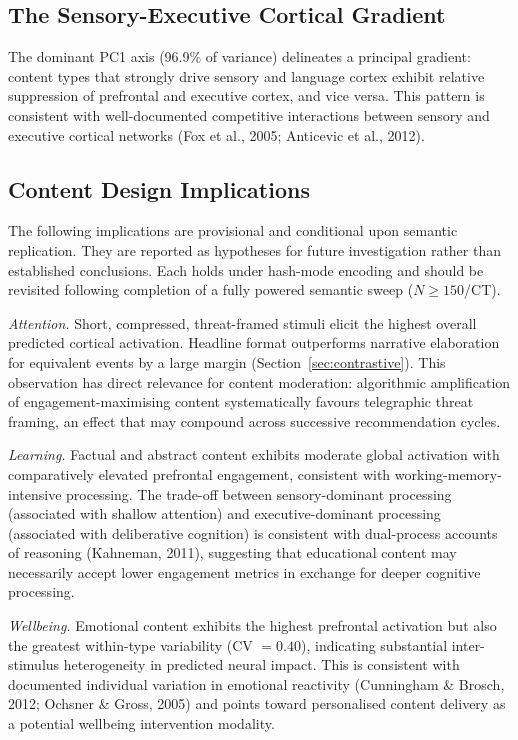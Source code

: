 \documentclass[11pt,letterpaper]{article}
\numberwithin{equation}{section}
\begin{document}
\subsection{The Sensory-Executive Cortical Gradient}

The dominant PC1 axis (96.9\% of variance) delineates a principal gradient: content types that strongly drive sensory and language cortex exhibit relative suppression of prefrontal and executive cortex, and vice versa. This pattern is consistent with well-documented competitive interactions between sensory and executive cortical networks (Fox et al., 2005; Anticevic et al., 2012).

\subsection{Content Design Implications}

The following implications are provisional and conditional upon semantic replication. They are reported as hypotheses for future investigation rather than established conclusions. Each holds under hash-mode encoding and should be revisited following completion of a fully powered semantic sweep ($N \geq 150$/CT).

\textit{Attention.} Short, compressed, threat-framed stimuli elicit the highest overall predicted cortical activation. Headline format outperforms narrative elaboration for equivalent events by a large margin (Section~\ref{sec:contrastive}). This observation has direct relevance for content moderation: algorithmic amplification of engagement-maximising content systematically favours telegraphic threat framing, an effect that may compound across successive recommendation cycles.

\textit{Learning.} Factual and abstract content exhibits moderate global activation with comparatively elevated prefrontal engagement, consistent with working-memory-intensive processing. The trade-off between sensory-dominant processing (associated with shallow attention) and executive-dominant processing (associated with deliberative cognition) is consistent with dual-process accounts of reasoning (Kahneman, 2011), suggesting that educational content may necessarily accept lower engagement metrics in exchange for deeper cognitive processing.

\textit{Wellbeing.} Emotional content exhibits the highest prefrontal activation but also the greatest within-type variability (CV $= 0.40$), indicating substantial inter-stimulus heterogeneity in predicted neural impact. This is consistent with documented individual variation in emotional reactivity (Cunningham \& Brosch, 2012; Ochsner \& Gross, 2005) and points toward personalised content delivery as a potential wellbeing intervention modality.
\end{document}

